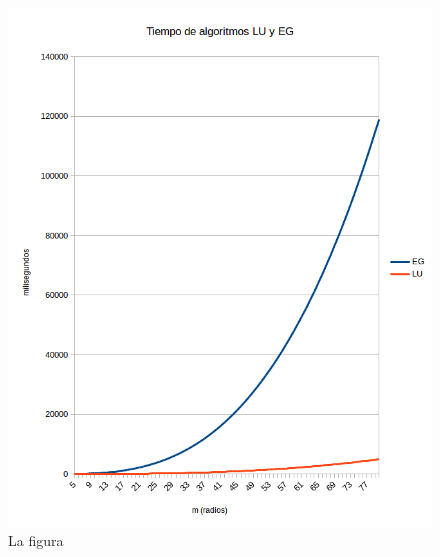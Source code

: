 \begin{figure}[h]
  \center
  \includegraphics[scale=0.8]{imagenes/tiempoLUyEGsinDividir.png}
  \caption{La figura}
  \label{fig:luyeg}
\end{figure}







